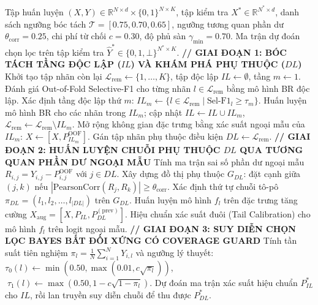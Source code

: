 \documentclass[10pt,a4paper,twoside]{article}
\begin{document}
\begin{algorithm}[H]
\caption{Quy trình Huấn luyện và Suy diễn Chọn lọc Toàn diện GSI-MLC-PA v6.3}
\label{alg:v63}
\begin{algorithmic}[1]
\Require Tập huấn luyện $(X, Y) \in \mathbb{R}^{N \times d} \times \{0, 1\}^{N \times K}$, tập kiểm tra $X^* \in \mathbb{R}^{N^* \times d}$, danh sách ngưỡng bóc tách $\mathcal{T} = [0.75, 0.70, 0.65]$, ngưỡng tương quan phần dư $\theta_{\text{corr}} = 0.25$, chi phí từ chối $c=0.30$, độ phủ sàn $\gamma_{\min}=0.70$.
\Ensure Ma trận dự đoán chọn lọc trên tập kiểm tra $\hat{Y}^* \in \{0, 1, \bot\}^{N^* \times K}$.
\Statex \textbf{// GIAI ĐOẠN 1: BÓC TÁCH TẦNG ĐỘC LẬP ($IL$) VÀ KHÁM PHÁ PHỤ THUỘC ($DL$)}
\State Khởi tạo tập nhãn còn lại $\mathcal{L}_{\text{rem}} \gets \{1, \dots, K\}$, tập độc lập $IL \gets \emptyset$, tầng $m \gets 1$.
    \State Đánh giá Out-of-Fold Selective-F1 cho từng nhãn $l \in \mathcal{L}_{\text{rem}}$ bằng mô hình BR độc lập.
    \State Xác định tầng độc lập thứ $m$: $IL_m \gets \{l \in \mathcal{L}_{\text{rem}} \mid \text{Sel-F1}_l \ge \tau_m\}$.
    \State Huấn luyện mô hình BR cho các nhãn trong $IL_m$; cập nhật $IL \gets IL \cup IL_m$, $\mathcal{L}_{\text{rem}} \gets \mathcal{L}_{\text{rem}} \setminus IL_m$.
    \State Mở rộng không gian đặc trưng bằng xác suất ngoại mẫu của $IL_m$: $X \gets [X, P^{\text{OOF}}_{IL_m}]$.
\EndFor
\State Gán tập nhãn phụ thuộc điều kiện $DL \gets \mathcal{L}_{\text{rem}}$.
\Statex \textbf{// GIAI ĐOẠN 2: HUẤN LUYỆN CHUỖI PHỤ THUỘC $DL$ QUA TƯƠNG QUAN PHẦN DƯ NGOẠI MẪU}
\State Tính ma trận sai số phần dư ngoại mẫu $R_{i, j} = Y_{i, j} - P^{\text{OOF}}_{i, j}$ với $j \in DL$.
\State Xây dựng đồ thị phụ thuộc $G_{DL}$: đặt cạnh giữa $(j, k)$ nếu $|\text{PearsonCorr}(R_j, R_k)| \ge \theta_{\text{corr}}$.
\State Xác định thứ tự chuỗi tô-pô $\pi_{DL} = (l_1, l_2, \dots, l_{|DL|})$ trên $G_{DL}$.
    \State Huấn luyện mô hình $f_l$ trên đặc trưng tăng cường $X_{\text{aug}} = [X, P_{IL}, P_{DL}^{(\text{prev})}]$.
    \State Hiệu chuẩn xác suất đuôi (Tail Calibration) cho mô hình $f_l$ trên logit ngoại mẫu.
\EndFor
\Statex \textbf{// GIAI ĐOẠN 3: SUY DIỄN CHỌN LỌC BAYES BẤT ĐỐI XỨNG CÓ COVERAGE GUARD}
\State Tính tần suất tiên nghiệm $\pi_l = \frac{1}{N} \sum_{i=1}^N Y_{i, l}$ và ngưỡng lý thuyết:
       $\tau_0(l) \gets \min(0.50, \max(0.01, c\sqrt{\pi_l}))$, $\; \tau_1(l) \gets \max(0.50, 1 - c\sqrt{1-\pi_l})$.
\State Dự đoán ma trận xác suất hiệu chuẩn $P^*_{IL}$ cho $IL$, rồi lan truyền suy diễn chuỗi để thu được $P^*_{DL}$.

\end{algorithmic}
\end{algorithm}
\end{document}
